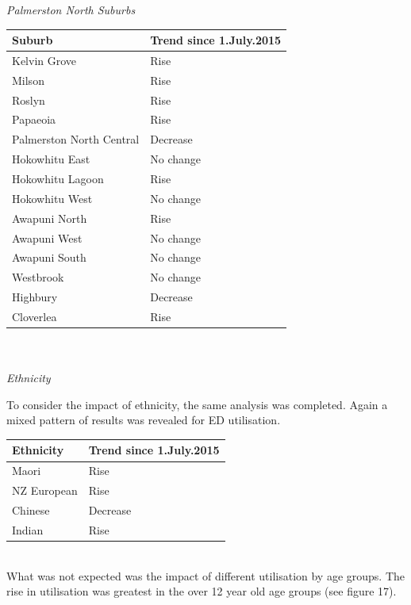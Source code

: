 \documentclass[11pt,a4paper]{article}
\begin{document}
\emph{Palmerston North Suburbs}

\begin{tabular}{|l|l|}
\hline
	Suburb & Trend since 1.July.2015\\
\hline
	Kelvin Grove & Rise\\
\hline
	Milson & Rise\\
\hline
	Roslyn & Rise\\
\hline
	Papaeoia & Rise\\
\hline
	Palmerston North Central & Decrease\\
\hline
	Hokowhitu East & No change\\
\hline
	Hokowhitu Lagoon & Rise\\
\hline
	Hokowhitu West & No change\\
\hline
	Awapuni North & Rise\\
\hline
	Awapuni West & No change\\
\hline
	Awapuni South & No change\\
\hline
	Westbrook & No change\\
\hline
	Highbury & Decrease\\
\hline
	Cloverlea & Rise\\
\hline
\end{tabular}
\\
\\

\emph{Ethnicity}

To consider the impact of ethnicity, the same analysis was completed. Again a mixed pattern of results was revealed for ED utilisation.

\begin{tabular}{|l|l|}
\hline
	Ethnicity & Trend since 1.July.2015\\
\hline
	Maori & Rise\\
\hline
	NZ European & Rise\\
\hline
	Chinese & Decrease\\
\hline
	Indian & Rise\\
\hline
\end{tabular}
\\

What was not expected was the impact of different utilisation by age groups. The rise in utilisation was greatest in the over 12 year old age groups (see figure 17).\\
\end{document}
